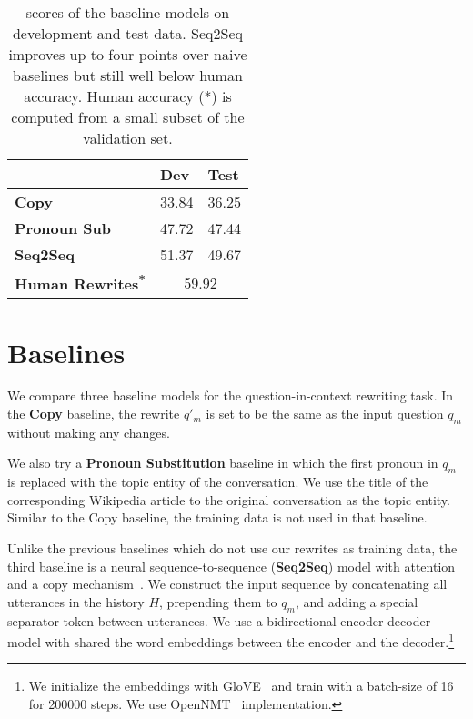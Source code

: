 
\begin{table}[]
\center
\begin{tabular}{lll}
\toprule
                             & \textbf{Dev} & \textbf{Test} \\ \hline
\textbf{Copy}                & 33.84        & 36.25         \\ 
\textbf{Pronoun Sub} & 47.72        & 47.44         \\ 
\textbf{Seq2Seq}          & 51.37        & 49.67         \\
\textbf{Human Rewrites\textsuperscript{*}}        &
                                                    \multicolumn{2}{c}{59.92}          \\ 
  \bottomrule
\end{tabular}

\caption{ scores of the baseline models on development and
  test data. Seq2Seq improves up
  to four points over naive baselines but still well below human
  accuracy.
    Human accuracy (*) is computed from a small subset of the
  validation set.}
\label{tab:bleu_results}
\end{table}

\section{Baselines}
\label{sec:expr}




We compare three baseline models for the question-in-context rewriting
task. In the \textbf{Copy} baseline, the rewrite $q'_m$ is set to be
the same as the input question $q_m$ without making any changes.

We also try a \textbf{Pronoun Substitution} baseline in which the first pronoun in $q_m$ is replaced with the topic entity of the conversation.
We use the title of the corresponding Wikipedia article to the
original \abr{\quac} conversation as the topic entity.
Similar to the Copy baseline, the training data is not used
in that baseline.

Unlike the previous baselines which do not use our rewrites as
training data, the third baseline is a neural sequence-to-sequence
(\textbf{Seq2Seq}) model with attention and a copy
mechanism~\cite{bahdanau2015Neural, see2017get}.
We construct the input sequence by concatenating all utterances in
the history $H$, prepending them to $q_m$, and adding a special separator token
between utterances. 
 We use a bidirectional  encoder-decoder model with shared the word embeddings between the encoder and the decoder.\footnote{We initialize the embeddings with GloVE~\cite{pennington2014glove} and 
train with a batch-size of 16 for 200000 steps.
We use OpenNMT~\cite{klein2018opennmt} implementation.}


